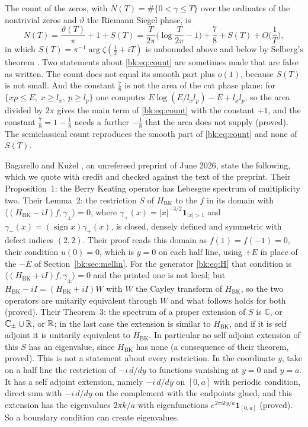 The count of the zeros, with $N(T)=\#\{0<\gamma\le T\}$ over the ordinates of the nontrivial zeros and $\vartheta$ the Riemann Siegel phase, is
\begin{equation}\label{bk:eq:count}
N(T)=\frac{\vartheta(T)}\pi+1+S(T)=\frac T{2\pi}\Big(\log\frac T{2\pi}-1\Big)+\frac78+S(T)+O\Big(\frac1T\Big),
\end{equation}
in which $S(T)=\pi^{-1}\arg\zeta(\frac12+iT)$ is unbounded above and below by Selberg's theorem \cite{Selberg46}. Two statements about \eqref{bk:eq:count} are sometimes made that are false as written. The count does not equal its smooth part plus $o(1)$, because $S(T)$ is not small. And the constant $\frac78$ is not the area of the cut phase plane: for $\{xp\le E,\ x\ge l_x,\ p\ge l_p\}$ one computes $E\log(E/l_xl_p)-E+l_xl_p$, so the area divided by $2\pi$ gives the main term of \eqref{bk:eq:count} with the constant $+1$, and the constant $\frac78=1-\frac18$ needs a further $-\frac18$ that the area does not supply (proved). The semiclassical count reproduces the smooth part of \eqref{bk:eq:count} and none of $S(T)$.

Bagarello and Ku\.{z}el \cite{BagarelloKuzel26}, an unrefereed preprint of June 2026, state the following, which we quote with credit and checked against the text of the preprint. Their Proposition~1: the Berry Keating operator has Lebesgue spectrum of multiplicity two. Their Lemma~2: the restriction $S$ of $H_{\mathrm{BK}}$ to the $f$ in its domain with $\langle(H_{\mathrm{BK}}-iI)f,\gamma_\pm\rangle=0$, where $\gamma_+(x)=|x|^{-3/2}\mathbf 1_{|x|>1}$ and $\gamma_-(x)=(\operatorname{sign}x)\gamma_+(x)$, is closed, densely defined and symmetric with defect indices $(2,2)$. Their proof reads this domain as $f(1)=f(-1)=0$, their condition $u(0)=0$, which is $y=0$ on each half line, using $+E$ in place of the $-E$ of Section~\ref{bk:sec:mellin}. For the generator \eqref{bk:eq:H} that condition is $\langle(H_{\mathrm{BK}}+iI)f,\gamma_\pm\rangle=0$ and the printed one is not local; but $H_{\mathrm{BK}}-iI=(H_{\mathrm{BK}}+iI)W$ with $W$ the Cayley transform of $H_{\mathrm{BK}}$, so the two operators are unitarily equivalent through $W$ and what follows holds for both (proved). Their Theorem~3: the spectrum of a proper extension of $S$ is $\mathbb C$, or $\mathbb C_\pm\cup\mathbb{R}$, or $\mathbb{R}$; in the last case the extension is similar to $H_{\mathrm{BK}}$, and if it is self adjoint it is unitarily equivalent to $H_{\mathrm{BK}}$. In particular no self adjoint extension of this $S$ has an eigenvalue, since $H_{\mathrm{BK}}$ has none (a consequence of their theorem, proved). This is not a statement about every restriction. In the coordinate $y$, take on a half line the restriction of $-i\,d/dy$ to functions vanishing at $y=0$ and $y=a$. It has a self adjoint extension, namely $-i\,d/dy$ on $[0,a]$ with periodic condition, direct sum with $-i\,d/dy$ on the complement with the endpoints glued, and this extension has the eigenvalues $2\pi k/a$ with eigenfunctions $e^{2\pi iky/a}\mathbf 1_{[0,a]}$ (proved). So a boundary condition can create eigenvalues.

